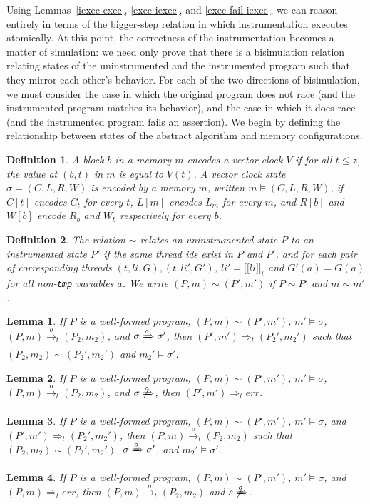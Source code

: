 \documentclass[preprint, 10pt]{sigplanconf}
\newcommand{\meanl}{\ensuremath{[ \! [}}
\newcommand{\meanr}{\ensuremath{] \! ]}}
\newcommand{\means}[1]{\ensuremath{\meanl #1 \meanr}}
\newcommand{\instr}[2]{\ensuremath{\means{#2}_{#1}}}
\newcommand{\cfg}[2]{\ensuremath{(#1, #2)}}
\newcommand{\anarrow}[2]{\ensuremath{\xrightarrow{#2}_{#1}}}
\newcommand{\exec}[5]{\ensuremath{\cfg{#1}{#2} \anarrow{#3}{#4} #5}}
\newcommand{\iexec}[4]{\ensuremath{\cfg{#1}{#2} \Rightarrow_{#3} #4}}
\newtheorem{lemma}{Lemma}
\newtheorem{definition}{Definition}
\begin{document}
Using Lemmas~\ref{iexec-exec}, \ref{exec-iexec}, and \ref{exec-fail-iexec}, we can reason entirely in terms of the bigger-step relation in which instrumentation executes atomically. At this point, the correctness of the instrumentation becomes a matter of simulation: we need only prove that there is a bisimulation relation relating states of the uninstrumented and the instrumented program such that they mirror each other's behavior. For each of the two directions of bisimulation, we must consider the case in which the original program does not race (and the instrumented program matches its behavior), and the case in which it does race (and the instrumented program fails an assertion). We begin by defining the relationship between states of the abstract algorithm and memory configurations.
\begin{definition}A block $b$ in a memory $m$ \emph{encodes} a vector clock $V$ if for all $t \le z$, the value at $(b, t)$ in $m$ is equal to $V(t)$. A vector clock state $\sigma = (C, L, R, W)$ is encoded by a memory $m$, written $m \models (C, L, R, W)$, if $C[t]$ encodes $C_t$ for every $t$, $L[m]$ encodes $L_m$ for every $m$, and $R[b]$ and $W[b]$ encode $R_b$ and $W_b$ respectively for every $b$.\end{definition}

\begin{definition}The relation $\sim$ relates an uninstrumented state $P$ to an instrumented state $P'$ if the same thread ids exist in $P$ and $P'$, and for each pair of corresponding threads $(t, \mathit{li}, G), (t, \mathit{li}', G')$, $\mathit{li}' = \instr{t}{\mathit{li}}$ and $G'(a) = G(a)$ for all non-\texttt{tmp} variables $a$. We write $(P, m) \sim (P', m')$ if $P \sim P'$ and $m \sim m'$.\end{definition}
\begin{lemma}If $P$ is a well-formed program, $(P, m) \sim (P', m')$, $m' \models \sigma$, $\exec{P}{m}{t}{o}{(P_2, m_2)}$, and $\sigma \xRightarrow{o} \sigma'$, then $\iexec{P'}{m'}{t}{(P_2', m_2')}$ such that $(P_2, m_2) \sim (P_2', m_2')$ and $m_2' \models \sigma'$.\end{lemma}
\begin{lemma}If $P$ is a well-formed program, $(P, m) \sim (P', m')$, $m' \models \sigma$, $\exec{P}{m}{t}{o}{(P_2, m_2)}$, and $\sigma \not\xRightarrow{o}$, then $\iexec{P'}{m'}{t}{\mathit{err}}$.\end{lemma}
\begin{lemma}If $P$ is a well-formed program, $(P, m) \sim (P', m')$, $m' \models \sigma$, and $\iexec{P'}{m'}{t}{(P_2', m_2')}$, then $\exec{P}{m}{t}{o}{(P_2, m_2)}$ such that $(P_2, m_2) \sim (P_2', m_2')$, $\sigma \xRightarrow{o} \sigma'$, and $m_2' \models \sigma'$.\end{lemma}
\begin{lemma}If $P$ is a well-formed program, $(P, m) \sim (P', m')$, $m' \models \sigma$, and $\iexec{P}{m}{t}{\mathit{err}}$, then $\exec{P}{m}{t}{o}{(P_2, m_2)}$ and $s \not\xRightarrow{o}$.\end{lemma}
\end{document}
